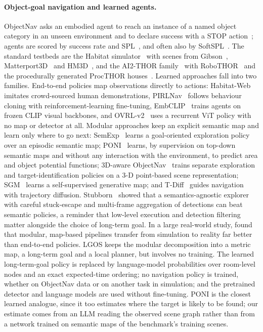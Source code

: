 \documentclass[10pt]{article}
\newcommand{\ours}{LGOS\xspace}
\begin{document}
\paragraph{Object-goal navigation and learned agents.}
ObjectNav asks an embodied agent to reach an instance of a named object category in an unseen
environment and to declare success with a STOP action~\citep{batra2020objectnav}; agents are scored by
success rate and SPL~\citep{anderson2018evaluation}, and often also by SoftSPL~\citep{datta2021integrating}.
The standard testbeds are the Habitat simulator~\citep{savva2019habitat,szot2021habitat} with scenes from
Gibson~\citep{xia2018gibson}, Matterport3D~\citep{chang2017matterport3d} and
HM3D~\citep{ramakrishnan2021habitat,yadav2023habitat}, and the AI2-THOR family~\citep{kolve2017ai2} with
RoboTHOR~\citep{deitke2020robothor} and the procedurally generated ProcTHOR houses~\citep{deitke2022procthor}.
Learned approaches fall into two families. End-to-end policies map observations directly to actions:
Habitat-Web~\citep{ramrakhya2022habitat} imitates crowd-sourced human demonstrations,
PIRLNav~\citep{ramrakhya2023pirlnav} follows behaviour cloning with reinforcement-learning fine-tuning,
EmbCLIP~\citep{khandelwal2022simple} trains agents on frozen CLIP visual backbones, and
OVRL-v2~\citep{yadav2023ovrl} uses a recurrent ViT policy with no map or detector at all. Modular
approaches keep an explicit semantic map and learn only where to go next: SemExp~\citep{chaplot2020object}
learns a goal-oriented exploration policy over an episodic semantic map; PONI~\citep{ramakrishnan2022poni}
learns, by supervision on top-down semantic maps and without any interaction with the environment, to
predict area and object potential functions; 3D-aware ObjectNav~\citep{zhang20233d} trains separate
exploration and target-identification policies on a 3-D point-based scene representation;
SGM~\citep{zhang2024imagine} learns a self-supervised generative map; and
T-Diff~\citep{yu2024trajectory} guides navigation with trajectory diffusion. Stubborn~\citep{luo2022stubborn}
showed that a semantics-agnostic explorer with careful stuck-escape and multi-frame aggregation of
detections can beat semantic policies, a reminder that low-level execution and detection filtering matter
alongside the choice of long-term goal. In a large real-world study, \citet{gervet2023navigating} found
that modular, map-based pipelines transfer from simulation to reality far better than end-to-end policies.
\ours keeps the modular decomposition into a metric map, a long-term goal and a local planner, but
involves no training. The learned long-term-goal policy is replaced by language-model probabilities over
room-level nodes and an exact expected-time ordering; no navigation policy is trained, whether on ObjectNav
data or on another task in simulation; and the pretrained detector and language models are used without
fine-tuning. PONI is the closest learned analogue, since it too estimates where the target is likely to
be found; our estimate comes from an LLM reading the observed scene graph rather than from a network
trained on semantic maps of the benchmark's training scenes.
\end{document}

